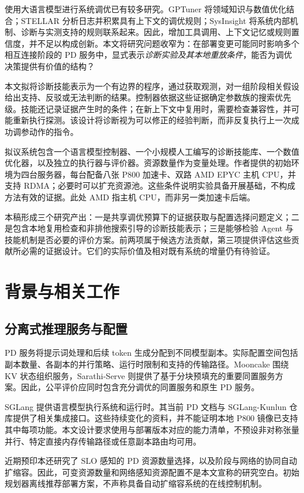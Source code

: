 \documentclass[UTF8,11pt,a4paper,fontset=windows]{ctexart}
\begin{document}
使用大语言模型进行系统调优已有较多研究。GPTuner 将领域知识与数值优化结合；STELLAR 分析日志并积累具有上下文的调优规则；SysInsight 将系统内部机制、诊断与实测支持的规则联系起来\cite{gptuner2024,stellar2025,sysinsight2026}。因此，增加工具调用、上下文记忆或规则置信度，并不足以构成创新。本文将研究问题收窄为：在部署变更可能同时影响多个相互连接阶段的 PD 服务中，显式表示\emph{诊断实验及其本地重放条件}，能否为调优决策提供有价值的结构？

本文拟将诊断技能表示为一个有边界的程序，通过获取观测，对一组阶段相关假设给出支持、反驳或无法判断的结果。控制器依据这些证据确定参数族的搜索优先级。技能还记录证据产生时的条件；在新上下文中复用时，需要检查兼容性，并可能重新执行探测。该设计将诊断视为可以修正的经验判断，而非反复执行上一次成功调参动作的指令。

拟议系统包含一个语言模型控制器、一个小规模人工编写的诊断技能库、一个数值优化器，以及独立的执行器与评价器。资源数量作为变量处理。作者提供的初始环境为四台服务器，每台配备八张 P800 加速卡、双路 AMD EPYC 主机 CPU，并支持 RDMA；必要时可以扩充资源池。这些条件说明实验具备开展基础，不构成方法有效的证据。此处 AMD 指主机 CPU，而非另一类加速卡后端。

本稿形成三个研究产出：一是共享调优预算下的证据获取与配置选择问题定义；二是包含本地复用检查和非排他搜索引导的诊断技能表示；三是能够检验 Agent 与技能机制是否必要的评价方案。前两项属于候选方法贡献，第三项提供评估这些贡献所必需的证据设计。它们的实际价值及相对既有系统的增量仍有待验证。

\section{背景与相关工作}
\subsection{分离式推理服务与配置}
PD 服务将提示词处理和后续 token 生成分配到不同模型副本。实际配置空间包括副本数量、各副本的并行策略、运行时限制和支持的传输路径。Mooncake 围绕 KV 状态组织服务，Sarathi-Serve 则提供了基于分块预填充的重要同置服务方案\cite{mooncake2024,sarathi2024}。因此，公平评价应同时包含充分调优的同置服务和原生 PD 服务。

SGLang 提供语言模型执行系统和运行时\cite{sglang2024}。其当前 PD 文档与 SGLang-Kunlun 仓库提供了相关集成接口\cite{sglangpd,kunlunplugin}。这些持续变化的资料，并不能证明本地 P800 镜像已支持其中每项功能。本文设计要求使用与部署版本对应的能力清单，不预设非对称张量并行、特定直接内存传输路径或任意副本路由均可用。

近期预印本还研究了 SLO 感知的 PD 资源数量选择，以及阶段与网络的协同自动扩缩容\cite{pdresources2026,tokenscale2025}。因此，可变资源数量和网络感知资源配置不是本文宣称的研究空白。初始规划器离线推荐部署方案，不声称具备自动扩缩容系统的在线控制机制。
\end{document}
